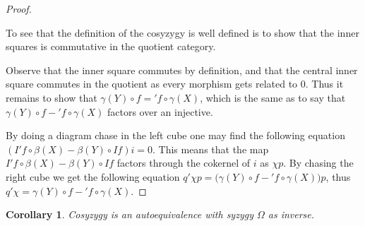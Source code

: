 \documentclass[12pt]{article}
\newtheorem{corollary}{Corollary}[theorem]
\theoremstyle{definition}
\theoremstyle{remark}
\newcommand{\upside}[1]{\rotatebox[origin=c]{180}{#1}}
\begin{document}
\begin{proof}
\begin{center}
                \end{center}
                To see that the definition of the cosyzygy is well defined is to show that the inner squares is commutative in the quotient category.
                
                Observe that the inner square commutes by definition, and that the central inner square commutes in the quotient as every morphism gets related to $0$. Thus it remains to show that \underline{$\gamma (Y)\circ$$f$}$=$\underline{$'f\circ\gamma (X)$}, which is the same as to say that $\gamma (Y)\circ$$f-$$'f\circ\gamma (X)$ factors over an injective.

                By doing a diagram chase in the left cube one may find the following equation $(I'f\circ \beta(X)-\beta (Y)\circ If)i=0$. This means that the map $I'f\circ \beta(X)-\beta (Y)\circ If$ factors through the cokernel of $i$ as $\chi p$. By chasing the right cube we get the following equation $q'\chi p = (\gamma (Y)\circ$$f-$$'f\circ\gamma (X))p$, thus $q'\chi =$$\gamma (Y)\circ$$f-$$'f\circ\gamma (X)$.
            \end{proof}

            \begin{corollary}
                Cosyzygy \upside{$\Omega$} is an autoequivalence with syzygy $\Omega$ as inverse.
            \end{corollary}
\end{document}
